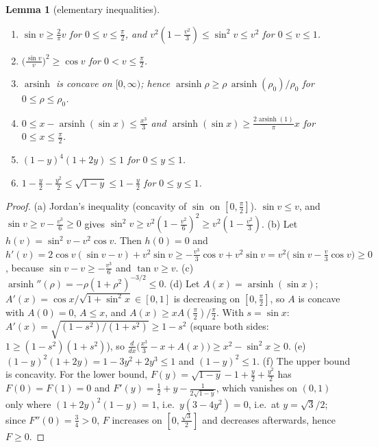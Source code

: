 \documentclass[11pt,a4paper]{article}
\theoremstyle{plain}
\newtheorem{lemma}[theorem]{Lemma}
\theoremstyle{definition}
\numberwithin{equation}{section}
\begin{document}
\begin{lemma}[elementary inequalities]\label{lem:elem}
\begin{enumerate}
\item[(a)] $\sin v\ge\frac{2}{\pi}v$ for $0\le v\le\frac\pi2$, and $v^2(1-\frac{v^2}3)\le\sin^2v\le v^2$ for $0\le v\le1$.
\item[(b)] $\big(\frac{\sin v}{v}\big)^2\ge\cos v$ for $0<v\le\frac\pi2$.
\item[(c)] $\operatorname{arsinh}$ is concave on $[0,\infty)$; hence $\operatorname{arsinh}\rho\ge\rho\,\operatorname{arsinh}(\rho_0)/\rho_0$ for $0\le\rho\le\rho_0$.
\item[(d)] $0\le x-\operatorname{arsinh}(\sin x)\le\frac{x^3}{3}$ and $\operatorname{arsinh}(\sin x)\ge\frac{2\operatorname{arsinh}(1)}{\pi}x$ for $0\le x\le\frac\pi2$.
\item[(e)] $(1-y)^4(1+2y)\le1$ for $0\le y\le1$.
\item[(f)] $1-\frac y2-\frac{y^2}2\le\sqrt{1-y}\le1-\frac y2$ for $0\le y\le1$.
\end{enumerate}
\end{lemma}
\begin{proof}
(a) Jordan's inequality (concavity of $\sin$ on $[0,\frac\pi2]$). $\sin v\le v$, and $\sin v\ge v-\frac{v^3}6\ge0$ gives $\sin^2v\ge v^2(1-\frac{v^2}6)^2\ge v^2(1-\frac{v^2}3)$.
(b) Let $h(v)=\sin^2v-v^2\cos v$. Then $h(0)=0$ and $h'(v)=2\cos v(\sin v-v)+v^2\sin v\ge-\frac{v^3}3\cos v+v^2\sin v=v^2\big(\sin v-\frac v3\cos v\big)\ge0$, because $\sin v-v\ge-\frac{v^3}{6}$ and $\tan v\ge v$.
(c) $\operatorname{arsinh}''(\rho)=-\rho(1+\rho^2)^{-3/2}\le0$.
(d) Let $A(x)=\operatorname{arsinh}(\sin x)$; $A'(x)=\cos x/\sqrt{1+\sin^2x}\in[0,1]$ is decreasing on $[0,\frac\pi2]$, so $A$ is concave with $A(0)=0$, $A\le x$, and $A(x)\ge xA(\frac\pi2)/\frac\pi2$. With $s=\sin x$: $A'(x)=\sqrt{(1-s^2)/(1+s^2)}\ge1-s^2$ (square both sides: $1\ge(1-s^2)(1+s^2)$), so $\frac{d}{dx}\big(\frac{x^3}3-x+A(x)\big)\ge x^2-\sin^2x\ge0$.
(e) $(1-y)^2(1+2y)=1-3y^2+2y^3\le1$ and $(1-y)^2\le1$.
(f) The upper bound is concavity. For the lower bound, $F(y)=\sqrt{1-y}-1+\frac y2+\frac{y^2}2$ has $F(0)=F(1)=0$ and $F'(y)=\frac12+y-\frac1{2\sqrt{1-y}}$, which vanishes on $(0,1)$ only where $(1+2y)^2(1-y)=1$, i.e.\ $y(3-4y^2)=0$, i.e.\ at $y=\sqrt3/2$; since $F''(0)=\frac34>0$, $F$ increases on $[0,\frac{\sqrt3}2]$ and decreases afterwards, hence $F\ge0$.
\end{proof}
\end{document}
